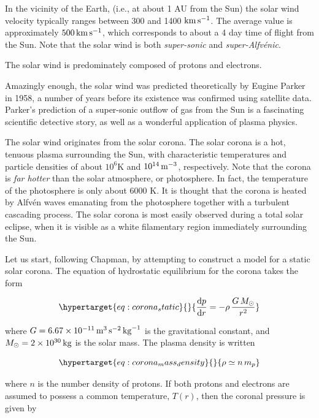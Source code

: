 \documentclass[
  notoc %
]{tufte-book}
\begin{document}
In the vicinity of the Earth, (i.e., at about 1 AU from the Sun) the
solar wind velocity typically ranges between 300 and 1400
\({\rm km}\,{\rm s}^{-1}\). The average value is approximately
\(500\,{\rm km}\,{\rm s}^{-1}\), which corresponds to about a 4 day time
of flight from the Sun. Note that the solar wind is both
\emph{super-sonic} and \emph{super-Alfvénic}.

The solar wind is predominately composed of protons and electrons.

Amazingly enough, the solar wind was predicted theoretically by Eugine
Parker in 1958, a number of years before its existence was confirmed
using satellite data. Parker's prediction of a super-sonic outflow of
gas from the Sun is a fascinating scientific detective story, as well as
a wonderful application of plasma physics.

The solar wind originates from the solar corona. The solar corona is a
hot, tenuous plasma surrounding the Sun, with characteristic
temperatures and particle densities of about \(10^6\)K and
\(10^{14}\,{\rm m}^{-3}\), respectively. Note that the corona is
\emph{far hotter} than the solar atmosphere, or photosphere. In fact,
the temperature of the photosphere is only about 6000 K. It is thought
that the corona is heated by Alfvén waves emanating from the photosphere
together with a turbulent cascading process. The solar corona is most
easily observed during a total solar eclipse, when it is visible as a
white filamentary region immediately surrounding the Sun.

Let us start, following Chapman, by attempting to construct a model for
a static solar corona. The equation of hydrostatic equilibrium for the
corona takes the form

\begin{equation}\protect\hypertarget{eq:corona_static}{}{
\frac{\mathrm{d}p}{\mathrm{d}r} = - \rho\,\frac{G\,M_\odot}{r^2}
}\label{eq:corona_static}\end{equation}

where
\(G= 6.67\times 10^{-11}\,{\rm m}^{3}\,{\rm s}^{-2}\,{\rm kg}^{-1}\) is
the gravitational constant, and \(M_\odot=2\times 10^{30}\,{\rm kg}\) is
the solar mass. The plasma density is written

\begin{equation}\protect\hypertarget{eq:corona_mass_density}{}{
\rho\simeq n\,m_p
}\label{eq:corona_mass_density}\end{equation}

where \(n\) is the number density of protons. If both protons and
electrons are assumed to possess a common temperature, \(T(r)\), then
the coronal pressure is given by
\end{document}
